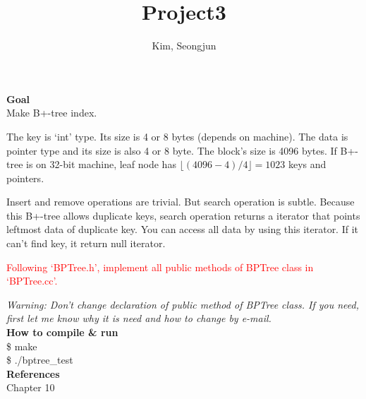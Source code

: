 \documentclass[11pt]{article}
\title{Project3}
\author{Kim, Seongjun}
\newcommand{\head}[1]{\LARGE \textbf{#1} \normalsize \\}
\begin{document}
\maketitle
\head{Goal}
Make B+-tree index.

The key is `int' type. Its size is 4 or 8 bytes (depends on machine). The data is pointer type and its size is also 4 or 8 byte. The block's size is 4096 bytes. If B+-tree is on 32-bit machine, leaf node has $\lfloor (4096-4) / 4 \rfloor = 1023$ keys and pointers.

Insert and remove operations are trivial. But search operation is subtle. Because this B+-tree allows duplicate keys, search operation returns a iterator that points leftmost data of duplicate key. You can access all data by using this iterator. If it can't find key, it return null iterator.

\Large \textcolor{red}{Following `BPTree.h', implement all public methods of BPTree class in `BPTree.cc'.} \normalsize

\emph{Warning: Don't change declaration of public method of BPTree class. If you need, first let me know why it is need and how to change by e-mail.}
\\

\head{How to compile \& run}
	\$ make \\
	\$ ./bptree\_test
\\

\head{References}
Chapter 10
\end{document}
